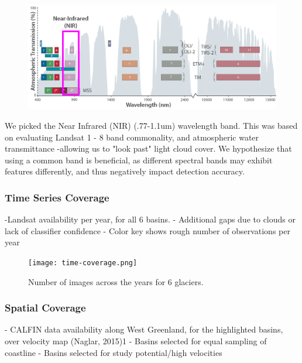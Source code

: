 \documentclass[tc, manuscript]{copernicus}
\begin{document}
\begin{figure}[t]
\includegraphics[width=17cm]{all_Landsat_bands_annotated.png}
\centering
\end{figure}
We picked the Near Infrared (NIR) (.77-1.1um) wavelength band. This was based on evaluating  Landsat 1 - 8 band commonality, and atmospheric water transmittance -allowing us to "look past" light cloud cover. We hypothesize that using a common band is beneficial, as different spectral bands may exhibit features differently, and thus negatively impact detection accuracy.





\subsubsection{Time Series Coverage}
-Landsat availability per year, for all 6 basins.
- Additional gaps due to clouds or lack of classifier confidence
- Color key shows rough number of observations per year

\begin{figure} %
    \centering
    \texttt{[image: time-coverage.png]}
    \caption{Number of images across the years for 6 glaciers.}
\end{figure}


\subsubsection{Spatial Coverage}
- CALFIN data availability along West Greenland, for the highlighted basins, over velocity map (Naglar, 2015)1
- Basins selected for equal sampling of coastline
- Basins selected for study potential/high velocities
\end{document}
